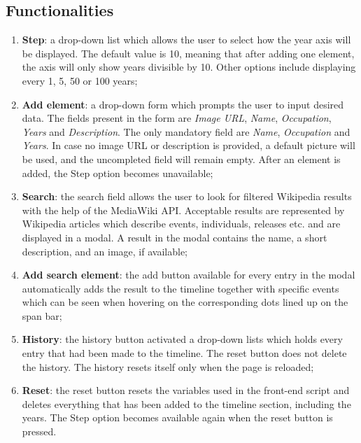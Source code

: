 \documentclass{report}
\begin{document}
\subsection {Functionalities}
\begin{enumerate}
  \item \textbf{Step}: a drop-down list which allows the user to select how the year axis will be displayed. The default value is 10, meaning that after adding one element, the axis will only show years divisible by 10. Other options include displaying every 1, 5, 50 or 100 years;

  \item \textbf{Add element}: a drop-down form which prompts the user to input desired data. The fields present in the form are \textit{Image URL}, \textit{Name}, \textit{Occupation}, \textit{Years} and \textit{Description}. The only mandatory field are \textit{Name}, \textit{Occupation} and \textit{Years}. In case no image URL or description is provided, a default picture will be used, and the uncompleted field will remain empty. After an element is added, the Step option becomes unavailable;

  \item \textbf{Search}: the search field allows the user to look for filtered Wikipedia results with the help of the MediaWiki API. Acceptable results are represented by Wikipedia articles which describe events, individuals, releases etc. and are displayed in a modal. A result in the modal contains the name, a short description, and an image, if available;

  \item \textbf{Add search element}: the add button available for every entry in the modal automatically adds the result to the timeline together with specific events which can be seen when hovering on the corresponding dots lined up on the span bar;

  \item \textbf{History}: the history button activated a drop-down lists which holds every entry that had been made to the timeline. The reset button does not delete the history. The history resets itself only when the page is reloaded;

  \item \textbf{Reset}: the reset button resets the variables used in the front-end script and deletes everything that has been added to the timeline section, including the years. The Step option becomes available again when the reset button is pressed.

\end{enumerate}
\end{document}
